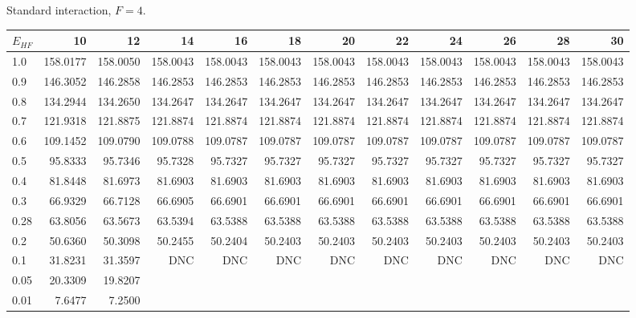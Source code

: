 \begin{landscape}
\begin{table}
\begin{center}
Standard interaction, $F=4$.\\
\begin{tabular}{l|rrrrrrrrrrr}
\hline 
$E_{HF}$ & 10 & 12 & 14 & 16 & 18 & 20 & 22 & 24 & 26 & 28 & 30 \\
\hline \hline
1.0 & 158.0177 & 158.0050 & 158.0043 & 158.0043 & 158.0043 & 158.0043 & 158.0043 & 158.0043 & 158.0043 & 158.0043 & 158.0043 \\ 
0.9 & 146.3052 & 146.2858 & 146.2853 & 146.2853 & 146.2853 & 146.2853 & 146.2853 & 146.2853 & 146.2853 & 146.2853 & 146.2853 \\ 
0.8 & 134.2944 & 134.2650 & 134.2647 & 134.2647 & 134.2647 & 134.2647 & 134.2647 & 134.2647 & 134.2647 & 134.2647 & 134.2647 \\ 
0.7 & 121.9318 & 121.8875 & 121.8874 & 121.8874 & 121.8874 & 121.8874 & 121.8874 & 121.8874 & 121.8874 & 121.8874 & 121.8874 \\ 
0.6 & 109.1452 & 109.0790 & 109.0788 & 109.0787 & 109.0787 & 109.0787 & 109.0787 & 109.0787 & 109.0787 & 109.0787 & 109.0787 \\ 
0.5 &  95.8333 &  95.7346 &  95.7328 &  95.7327 &  95.7327 &  95.7327 &  95.7327 &  95.7327 &  95.7327 &  95.7327 &  95.7327 \\ 
0.4 &  81.8448 &  81.6973 &  81.6903 &  81.6903 &  81.6903 &  81.6903 &  81.6903 &  81.6903 &  81.6903 &  81.6903 &  81.6903 \\ 
0.3 &  66.9329 &  66.7128 &  66.6905 &  66.6901 &  66.6901 &  66.6901 &  66.6901 &  66.6901 &  66.6901 &  66.6901 &  66.6901 \\ 
0.28&  63.8056 &  63.5673 &  63.5394 &  63.5388 &  63.5388 &  63.5388 &  63.5388 &  63.5388 &  63.5388 &  63.5388 &  63.5388 \\ 
0.2 &  50.6360 &  50.3098 &  50.2455 &  50.2404 &  50.2403 &  50.2403 &  50.2403 &  50.2403 &  50.2403 &  50.2403 &  50.2403 \\ 
0.1 &  31.8231 &  31.3597 &      DNC &      DNC &      DNC &      DNC &  DNC     &   DNC    &      DNC &      DNC &      DNC \\ 
0.05 & 20.3309 & 19.8207  \\ 
0.01 & 7.6477 & 7.2500  \\ 
\hline \hline
\end{tabular}
\end{center}
\begin{center}

\end{center}
\end{table}
\end{landscape}
